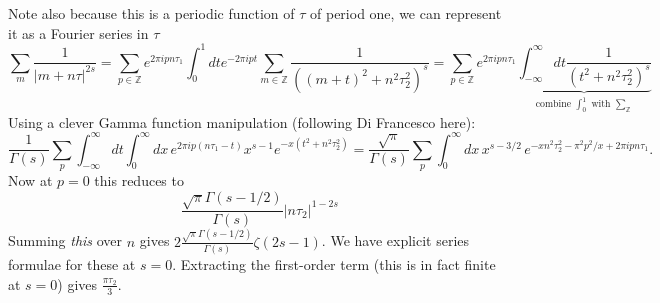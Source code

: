 \documentclass[11pt]{article}
\begin{document}
\begin{enumerate}
	Note also because this is a periodic function of $\tau$ of period one, we can represent it as a Fourier series in $\tau$
	\[
		\sum_{m} \frac{1}{|m+n\tau|^{2s}} 
		= \sum_{p \in \mathbb Z} e^{2 \pi i p n \tau_1} \int_0^1 dt e^{- 2\pi i p t} \sum_{m \in \mathbb Z} \frac{1}{((m + t)^2 + n^2 \tau_2^2)^s} 
		= \sum_{p \in \mathbb Z} e^{2 \pi i p n \tau_1} \underbrace{\int_{-\infty}^\infty dt \frac{1}{(t^2 + n^2 \tau_2^2)^s} }_{\text{combine $\int_0^1$ with $\sum_{\mathbb Z}$}}
	\]
	Using a clever Gamma function manipulation (following Di Francesco here):
	\[
		\frac{1}{\Gamma(s)} \sum_{p} \int_{-\infty}^\infty dt \int_0^\infty dx \, e^{2 \pi i p(n \tau_1 - t)}  x^{s-1} e^{-x (t^2 + n^2 \tau_2^2)} = \frac{\sqrt \pi}{\Gamma(s)} \sum_p \int_0^\infty dx\, x^{s-3/2}\, e^{-x n^2 \tau_2^2 - \pi^2 p^2/x + 2 \pi i p n \tau_1}.
	\]
	Now at $p = 0$ this reduces to
	\[
		\frac{\sqrt{\pi} \Gamma(s-1/2)}{\Gamma(s)} |n \tau_2|^{1-2s}
	\]
	Summing \emph{this} over $n$ gives $2 \frac{\sqrt{\pi} \Gamma(s-1/2)}{\Gamma(s)} \zeta(2s-1)$. We have explicit series formulae for these at $s = 0$. Extracting the first-order term (this is in fact finite at $s = 0$) gives $\frac{\pi \tau_2}{3}$. 
	

\end{enumerate}
\end{document}
